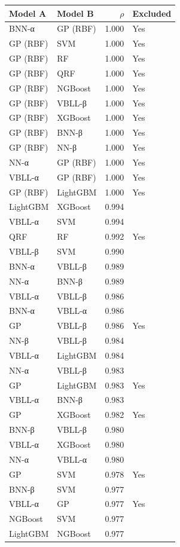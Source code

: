 \begin{tabular}{llrl}
\toprule
\textbf{Model A} & \textbf{Model B} & \textbf{$\rho$} & \textbf{Excluded} \\
\midrule
BNN-α & GP (RBF) & 1.000 & Yes \\
GP (RBF) & SVM & 1.000 & Yes \\
GP (RBF) & RF & 1.000 & Yes \\
GP (RBF) & QRF & 1.000 & Yes \\
GP (RBF) & NGBoost & 1.000 & Yes \\
GP (RBF) & VBLL-β & 1.000 & Yes \\
GP (RBF) & XGBoost & 1.000 & Yes \\
GP (RBF) & BNN-β & 1.000 & Yes \\
GP (RBF) & NN-β & 1.000 & Yes \\
NN-α & GP (RBF) & 1.000 & Yes \\
VBLL-α & GP (RBF) & 1.000 & Yes \\
GP (RBF) & LightGBM & 1.000 & Yes \\
LightGBM & XGBoost & 0.994 &  \\
VBLL-α & SVM & 0.994 &  \\
QRF & RF & 0.992 & Yes \\
VBLL-β & SVM & 0.990 &  \\
BNN-α & VBLL-β & 0.989 &  \\
NN-α & BNN-β & 0.989 &  \\
VBLL-α & VBLL-β & 0.986 &  \\
BNN-α & VBLL-α & 0.986 &  \\
GP & VBLL-β & 0.986 & Yes \\
NN-β & VBLL-β & 0.984 &  \\
VBLL-α & LightGBM & 0.984 &  \\
NN-α & VBLL-β & 0.983 &  \\
GP & LightGBM & 0.983 & Yes \\
VBLL-α & BNN-β & 0.983 &  \\
GP & XGBoost & 0.982 & Yes \\
BNN-β & VBLL-β & 0.980 &  \\
VBLL-α & XGBoost & 0.980 &  \\
NN-α & VBLL-α & 0.980 &  \\
GP & SVM & 0.978 & Yes \\
BNN-β & SVM & 0.977 &  \\
VBLL-α & GP & 0.977 & Yes \\
NGBoost & SVM & 0.977 &  \\
LightGBM & NGBoost & 0.977 &  \\

\end{tabular}
